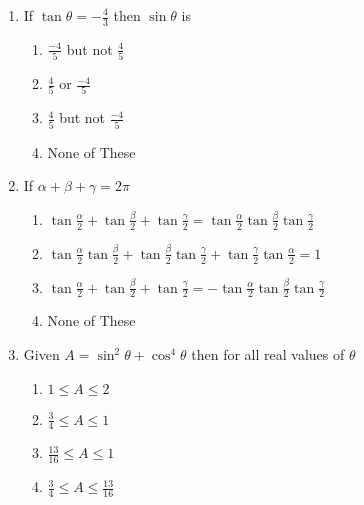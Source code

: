 \documentclass[journal,12pt,twocolumn]{IEEEtran}
\theoremstyle{remark}
\begin{document}
\begin{enumerate}



	\item If $\tan\theta =-\frac{4}{3}$ then $\sin \theta$ is 
		
		\hfill{}
		
  
		\begin{enumerate}
				\item $\frac{-4}{5}$ but not $\frac{4}{5}$ 
				\item $\frac{4}{5}$ or $\frac{-4}{5}$ 
				\item $\frac{4}{5}$ but not $\frac{-4}{5}$ 
				\item None of These 
		\end{enumerate}
  

  
	\item If $\alpha+ \beta +\gamma = 2\pi$ 
		\hfill{}
  
		\begin{enumerate}
  
  
			\item $\tan\frac{\alpha}{2} + \tan\frac{\beta}{2} + \tan\frac{\gamma}{2} = \tan\frac{\alpha}{2}\tan\frac{\beta}{2}\tan\frac{\gamma}{2}$
  
  
			\item $\tan\frac{\alpha}{2}\tan\frac{\beta}{2} + \tan\frac{\beta}{2}\tan\frac{\gamma}{2}+ \tan\frac{\gamma}{2}\tan\frac{\alpha}{2} = 1$
  
			\item $\tan\frac{\alpha}{2} + \tan\frac{\beta}{2} + \tan\frac{\gamma}{2} = -\tan\frac{\alpha}{2}\tan\frac{\beta}{2}\tan\frac{\gamma}{2}$
  
			\item None of These
  
 
		\end{enumerate}
  
  

	\item Given $A = \sin^{2}\theta + \cos^{4}\theta $ then for all real values of $\theta$ 
		\hfill{}
  
		\begin{enumerate}
				\item $1 \le A \le2$
  				\item $\frac{3}{4} \le A\le 1$ 
				\item $\frac{13}{16} \le A\le 1$
				\item $\frac{3}{4} \le A\le \frac{13}{16}$ 
		\end{enumerate}
  



\end{enumerate}
\end{document}
